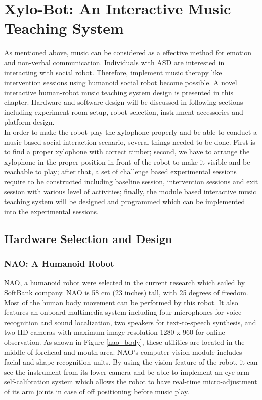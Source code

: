 \chapter{Xylo-Bot: An Interactive Music Teaching System} 
As mentioned above, music can be considered as a effective method
for emotion and non-verbal communication. Individuals with ASD are interested in 
interacting with social robot. Therefore, implement music therapy like intervention
sessions using humanoid social robot become possible. A novel interactive human-robot 
music teaching system design is presented in this chapter. Hardware and software
design will be discussed in following sections including experiment room setup, robot 
selection, instrument accessories and platform design.\\
In order to make the robot play the xylophone properly and be able to conduct a
music-based social interaction scenario, several things needed to be done. 
First is to find a proper xylophone with correct timber; second, we 
have to arrange the xylophone in the proper position in front of the robot 
to make it visible and be reachable to play; after that, a set of challenge based 
experimental sessions require to be constructed including baseline session, intervention
sessions and exit session with various level of activities; finally, the
module based interactive music teaching system will be designed and programmed 
which can be implemented into the experimental sessions.\\

\section{Hardware Selection and Design}

\subsection{NAO: A Humanoid Robot}
NAO, a humanoid robot were selected in the current research which sailed by SoftBank company. 
NAO is 58 cm (23 inches) tall, with 25 degrees of freedom. Most of the human body
movement can be performed by this robot. It also features an onboard multimedia 
system including four microphones for voice recognition and sound localization, 
two speakers for text-to-speech synthesis, and two HD cameras with maximum image 
resolution 1280 x 960 for online observation. As shown in Figure \ref{nao_body}, these 
utilities are located in the middle of forehead and mouth area. NAO’s 
computer vision module includes facial and shape recognition units. By using the 
vision feature of the robot, it can see the instrument from its lower camera 
and be able to implement an eye-arm self-calibration system which allows the 
robot to have real-time micro-adjustment of its arm joints in case of off 
positioning before music play.\\

